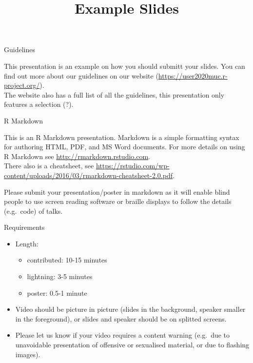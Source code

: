 \documentclass[
  ignorenonframetext,
]{beamer}
\title{Example Slides}
\author{}
\date{\vspace{-2.5em}}
\providecommand{\tightlist}{%
  \setlength{\itemsep}{0pt}\setlength{\parskip}{0pt}}
\begin{document}
\frame{\titlepage}

\begin{frame}{Guidelines}
\protect\hypertarget{guidelines}{}

This presentation is an example on how you should submitt your slides.
You can find out more about our guidelines on our website
(\url{https://user2020muc.r-project.org/}).\\
The website also has a full list of all the guidelines, this
presentation only features a selection (?).

\begin{block}{R Markdown}

This is an R Markdown presentation. Markdown is a simple formatting
syntax for authoring HTML, PDF, and MS Word documents. For more details
on using R Markdown see \url{http://rmarkdown.rstudio.com}.\\
There also is a cheatsheet, see
\url{https://rstudio.com/wp-content/uploads/2016/03/rmarkdown-cheatsheet-2.0.pdf}.

Please submit your presentation/poster in markdown as it will enable
blind people to use screen reading software or braille displays to
follow the details (e.g.~code) of talks.

\end{block}

\end{frame}

\begin{frame}

\begin{block}{Requirements}

\begin{itemize}
\tightlist
\item
  Length:

  \begin{itemize}
  \tightlist
  \item
    contributed: 10-15 minutes
  \item
    lightning: 3-5 minutes
  \item
    poster: 0.5-1 minute
  \end{itemize}
\item
  Video should be picture in picture (slides in the background, speaker
  smaller in the foreground), or slides and speaker should be on
  splitted screens.
\item
  Please let us know if your video requires a content warning (e.g.~due
  to unavoidable presentation of offensive or sexualised material, or
  due to flashing images).
\end{itemize}

\end{block}

\end{frame}
\end{document}
